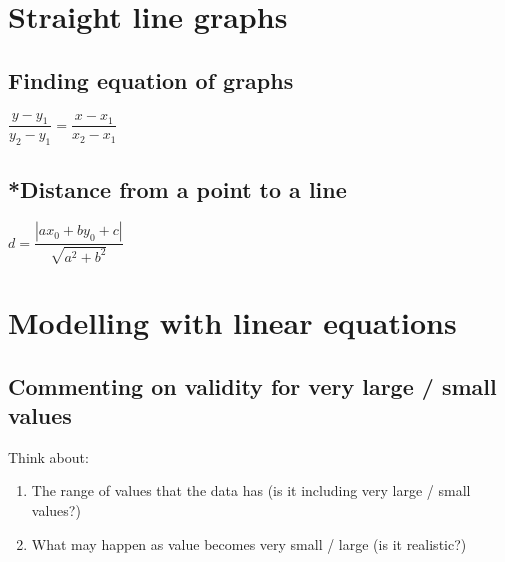 \section{Straight line graphs}
\subsection{Finding equation of graphs}
$\dfrac{y-y_1}{y_2-y_1}=\dfrac{x-x_1}{x_2-x_1}$

\subsection[]{*Distance from a point to a line}
$d=\dfrac{|ax_0+by_0+c|}{\sqrt{a^2+b^2}}$\\

\section{Modelling with linear equations}
\subsection{Commenting on validity for very large / small values}
Think about:
\begin{enumerate}
    \item The range of values that the data has (is it including very large / small values?)
    \item What may happen as value becomes very small / large (is it realistic?)
\end{enumerate}